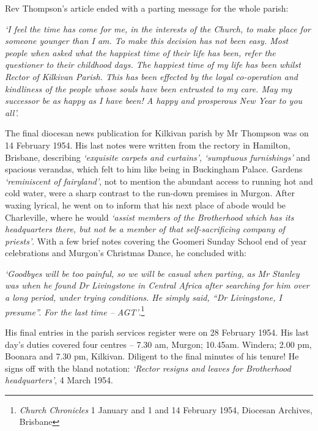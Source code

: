 Rev Thompson's article ended with a parting message for the whole parish:



\emph{`I feel the time has come for me, in the interests of the Church, to make place for someone younger than I am. To make this decision has not been easy. Most people when asked what the happiest time of their life has been, refer the questioner to their childhood days. The happiest time of my life has been whilst Rector of Kilkivan Parish. This has been effected by the loyal co-operation and kindliness of the people whose souls have been entrusted to my care. May my successor be as happy as I have been! A happy and prosperous New Year to you all'.}



The final diocesan news publication for Kilkivan parish by Mr Thompson was on 14 February 1954. His last notes were written from the rectory in Hamilton, Brisbane, describing \emph{`exquisite carpets and curtains'}, \emph{`sumptuous furnishings'} and spacious verandas, which felt to him like being in Buckingham Palace. Gardens \emph{`reminiscent of fairyland'}, not to mention the abundant access to running hot and cold water, were a sharp contrast to the run-down premises in Murgon. After waxing lyrical, he went on to inform that his next place of abode would be Charleville, where he would \emph{`assist members of the Brotherhood which has its headquarters there, but not be a member of that self-sacrificing company of priests'}. With a few brief notes covering the Goomeri Sunday School end of year celebrations and Murgon's Christmas Dance, he concluded with:



\emph{`Goodbyes will be too painful, so we will be casual when parting, as Mr Stanley was when he found Dr Livingstone in Central Africa after searching for him over a long period, under trying conditions. He simply said, ``Dr Livingstone, I presume''. For the last time -- AGT'}.\footnote{\emph{Church Chronicles} 1 January and 1 and 14 February 1954, Diocesan Archives, Brisbane}


\smallskip


His final entries in the parish services register were on 28 February 1954. His last day's duties covered four centres -- 7.30 am, Murgon; 10.45am. Windera; 2.00 pm, Boonara and 7.30 pm, Kilkivan. Diligent to the final minutes of his tenure! He signs off with the bland notation: \emph{`Rector resigns and leaves for Brotherhood headquarters'}, 4 March 1954.




